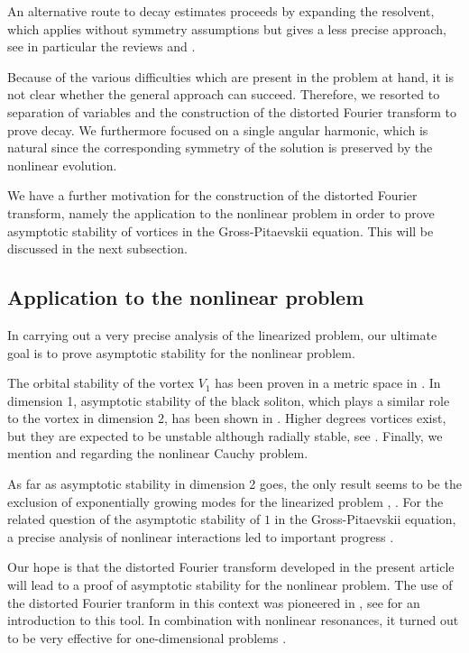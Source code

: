 \documentclass[11 pt]{amsart}
\theoremstyle{definition}
\theoremstyle{remark}
\numberwithin{equation}{section}
\begin{document}
An alternative route to decay estimates proceeds by expanding the resolvent, which applies without symmetry assumptions but gives a less precise approach, see in particular the reviews \cite{Schlag1,Schlag2} and \cite{JourneSofferSogge,RodnianskiSchlag,GoldbergSchlag}.

Because of the various difficulties which are present in the problem at hand, it is not clear whether the general approach can succeed. Therefore, we resorted to separation of variables and the construction  of the distorted Fourier transform to prove decay. We furthermore focused on a single angular harmonic, which is natural since the corresponding symmetry of the solution is preserved by the nonlinear evolution.

We have a further motivation for the construction of the distorted Fourier transform, namely the application to the nonlinear problem in order to prove asymptotic stability of vortices in the Gross-Pitaevskii equation. This will be discussed in the next subsection.


\subsection{Application to the nonlinear problem} In carrying out a very precise analysis of the linearized problem, our ultimate goal is to prove asymptotic stability for the nonlinear problem.

The orbital stability of the vortex $V_1$ has been proven in a metric space in \cite{GPS}. In dimension 1, asymptotic stability of the black soliton, which plays a similar role to the vortex in dimension 2, has been shown in \cite{GraSme}. Higher degrees vortices exist, but they are expected to be unstable although radially stable, see \cite{OvSi}. Finally, we mention \cite{Gallo} and \cite{Gerard_Cauchy1} regarding the nonlinear Cauchy problem.

As far as asymptotic stability in dimension 2 goes, the only result seems to be the exclusion of exponentially growing modes for the linearized problem \cite{delP_Fel_Kow}, \cite{WeinsteinXin}. For the related question of the asymptotic stability of $1$ in the Gross-Pitaevskii equation, a precise analysis of nonlinear interactions led to important progress  \cite{GuoHaniNakanishi,GustafsonNakanishiTsai1,GustafsonNakanishiTsai2,GustafsonNakanishiTsai3}.

Our hope is that the distorted Fourier transform developed in the present article will lead to a proof of asymptotic stability for the nonlinear problem. The use of the distorted Fourier tranform in this context was pioneered in \cite{KriegerSchlag}, see \cite{KoSchlag} for an introduction to this tool. In combination with nonlinear resonances, it turned out to be very effective for one-dimensional problems \cite{ChenLuhrmann,CollotGermain,Germain,GermainPusateri,KairzhanPusateri,LiLuhrmann}.
\end{document}
